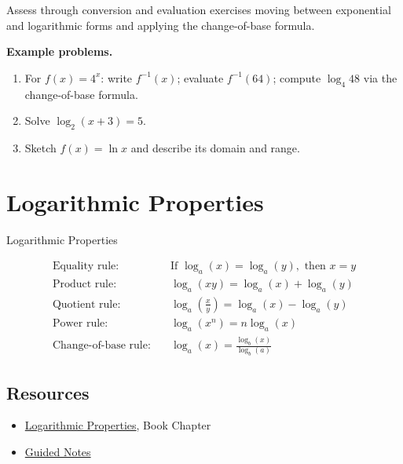 Assess through conversion and evaluation exercises moving between
exponential and logarithmic forms and applying the change-of-base formula.

\textbf{Example problems.}
\begin{enumerate}
    \item For $f(x)=4^x$: write $f^{-1}(x)$; evaluate $f^{-1}(64)$;
          compute $\log_4 48$ via the change-of-base formula.
    \item Solve $\log_2(x+3)=5$.
    \item Sketch $f(x)=\ln x$ and describe its domain and range.
\end{enumerate}



\section{Logarithmic Properties}
\label{sec:loga-ebc4}


Logarithmic Properties



\begin{align} \text{Equality rule:} &\quad \text{If } \log _a(x) = \log _a(y), \text{ then } x = y \\ \text{Product rule:} &\quad \log _a(xy) = \log _a(x) + \log _a(y) \\ \text{Quotient rule:} &\quad \log _a\left(\frac{x}{y}\right) = \log _a(x) - \log _a(y) \\ \text{Power rule:} &\quad \log _a(x^n) = n\log _a(x) \\ \text{Change-of-base rule:} &\quad \log _a(x) = \frac{\log _b(x)}{\log _b(a)} \end{align} 




\subsection{Resources}
\label{sss:reso-55b5}




\begin{itemize}
    \item \href{https://mathresearch.utsa.edu/wikiFiles/MAT1053/Logarithmic\%20Properties/MAT1053_M6.1Logarithmic_Properties.pdf}{Logarithmic Properties}, Book Chapter
    \item \href{https://mathresearch.utsa.edu/wikiFiles/MAT1053/Logarithmic\%20Properties/MAT1053_M6.1Logarithmic_PropertiesGN.pdf}{Guided Notes}
\end{itemize}


